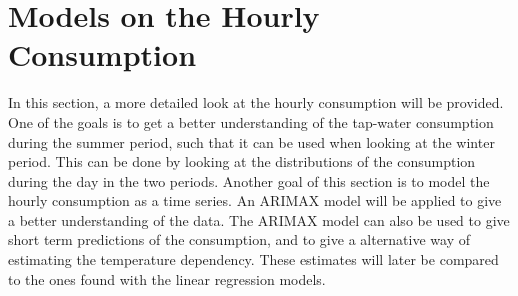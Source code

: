 \chapter{Models on the Hourly Consumption}
\label{chap: hourly}
In this section, a more detailed look at the hourly consumption will be provided. One of the goals is to get a better understanding of the tap-water consumption during the summer period, such that it can be used when looking at the winter period. This can be done by looking at the distributions of the consumption during the day in the two periods. Another goal of this section is to model the hourly consumption as a time series. An ARIMAX model will be applied to give a better understanding of the data. The ARIMAX model can also be used to give short term predictions of the consumption, and to give a alternative way of estimating the temperature dependency. These estimates will later be compared to the ones found with the linear regression models.

